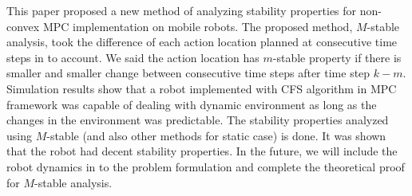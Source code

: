 \documentclass{ifacconf}
\begin{document}
This paper proposed a new method of analyzing stability properties for non-convex MPC implementation on mobile robots. The proposed method, $M$-stable analysis, took the difference of each action location planned at consecutive time steps in to account. We said the action location has $m$-stable property if there is smaller and smaller change between consecutive time steps after time step $k-m$. Simulation  results show that a robot implemented with CFS algorithm in MPC framework was capable of dealing with dynamic environment as long as the changes in the environment was predictable. The stability properties analyzed using $M$-stable (and also other methods for static case) is done. It was shown that the robot had decent stability properties. In the future, we will include the robot dynamics in to the problem formulation and complete the theoretical proof for $M$-stable analysis.



\end{document}
